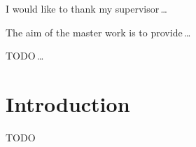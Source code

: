 \documentclass[12pt,oneside]{fithesis2}
\begin{document}
\FrontMatter                    %
\ThesisTitlePage                %
\begin{ThesisDeclaration}       %
  \DeclarationText
  \AdvisorName
\end{ThesisDeclaration}

\begin{ThesisThanks}            %
  I would like to thank my supervisor\,\dots
\end{ThesisThanks}

\begin{ThesisAbstract}          %
  The aim of the master work is to provide\,\dots
\end{ThesisAbstract}

\begin{ThesisKeyWords}          %
  TODO\,\dots
\end{ThesisKeyWords}

\tableofcontents                %

\MainMatter                     %
\chapter{Introduction}          %
TODO \cite{rfc_owamp}

    
\end{document}
